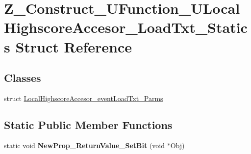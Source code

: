 \hypertarget{struct_z___construct___u_function___u_local_highscore_accesor___load_txt___statics}{}\section{Z\+\_\+\+Construct\+\_\+\+U\+Function\+\_\+\+U\+Local\+Highscore\+Accesor\+\_\+\+Load\+Txt\+\_\+\+Statics Struct Reference}
\label{struct_z___construct___u_function___u_local_highscore_accesor___load_txt___statics}
\subsection*{Classes}
\begin{DoxyCompactItemize}
\item 
struct \mbox{\hyperlink{struct_z___construct___u_function___u_local_highscore_accesor___load_txt___statics_1_1_local_hig4f769f0fb333d00ad3476ae0b21346ac}{Local\+Highscore\+Accesor\+\_\+event\+Load\+Txt\+\_\+\+Parms}}
\end{DoxyCompactItemize}
\subsection*{Static Public Member Functions}
\begin{DoxyCompactItemize}
\item 
\mbox{\label{struct_z___construct___u_function___u_local_highscore_accesor___load_txt___statics_a08f4fe93ff0119de2c13ab0557da2b08}} 
static void {\bfseries New\+Prop\+\_\+\+Return\+Value\+\_\+\+Set\+Bit} (void $\ast$Obj)
\end{DoxyCompactItemize}

